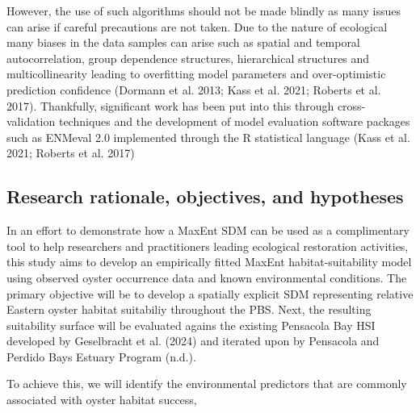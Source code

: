 \documentclass[
  letterpaper,
  DIV=11,
  numbers=noendperiod]{scrartcl}
\begin{document}
However, the use of such algorithms should not be made blindly as many
issues can arise if careful precautions are not taken. Due to the nature
of ecological many biases in the data samples can arise such as spatial
and temporal autocorrelation, group dependence structures, hierarchical
structures and multicollinearity leading to overfitting model parameters
and over-optimistic prediction confidence (Dormann et al. 2013; Kass et
al. 2021; Roberts et al. 2017). Thankfully, significant work has been
put into this through cross-validation techniques and the development of
model evaluation software packages such as ENMeval 2.0 implemented
through the R statistical language (Kass et al. 2021; Roberts et al.
2017)

\subsection{Research rationale, objectives, and
hypotheses}\label{research-rationale-objectives-and-hypotheses}

In an effort to demonstrate how a MaxEnt SDM can be used as a
complimentary tool to help researchers and practitioners leading
ecological restoration activities, this study aims to develop an
empirically fitted MaxEnt habitat-suitability model using observed
oyster occurrence data and known environmental conditions. The primary
objective will be to develop a spatially explicit SDM representing
relative Eastern oyster habitat suitabiliy throughout the PBS. Next, the
resulting suitability surface will be evaluated agains the existing
Pensacola Bay HSI developed by Geselbracht et al. (2024) and iterated
upon by Pensacola and Perdido Bays Estuary Program (n.d.).

To achieve this, we will identify the environmental predictors that are
commonly associated with oyster habitat success,
\end{document}
